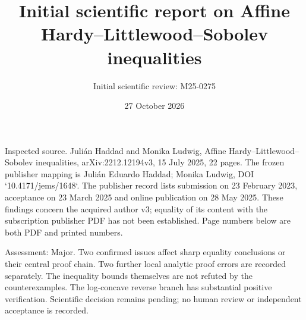 \documentclass[10pt]{article}
\title{Initial scientific report on
Affine Hardy–Littlewood–Sobolev inequalities}
\author{Initial scientific review: M25-0275}
\date{27 October 2026}
\begin{document}
\maketitle
Inspected source. Julián Haddad and Monika Ludwig, Affine Hardy–Littlewood–Sobolev inequalities, arXiv:2212.12194v3, 15 July 2025, 22 pages. The frozen publisher mapping is Julián Eduardo Haddad; Monika Ludwig, DOI `10.4171/jems/1648`. The publisher record lists submission on 23 February 2023, acceptance on 23 March 2025 and online publication on 28 May 2025. These findings concern the acquired author v3; equality of its content with the subscription publisher PDF has not been established. Page numbers below are both PDF and printed numbers.\par
Assessment: Major. Two confirmed issues affect sharp equality conclusions or their central proof chain. Two further local analytic proof errors are recorded separately. The inequality bounds themselves are not refuted by the counterexamples. The log-concave reverse branch has substantial positive verification. Scientific decision remains pending; no human review or independent acceptance is recorded.\par
\end{document}
